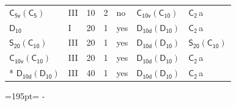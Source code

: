 \documentclass[10pt,a4paper]{article}
\newcommand{\needspace}[1]{\par\penalty-100\begingroup\dimen0=#1\relax\dimen2=\pagegoal
  \advance\dimen2-\pagetotal\ifdim\dimen0>\dimen2\relax\ifdim\dimen2>0pt\vfil\break\fi\fi
  \endgroup}
\numberwithin{equation}{section}
\newcommand{\grp}[1]{\mathsf{#1}}
\newcommand{\clsletter}[1]{\,{\scriptsize\color{black!55}#1}}
\begin{document}
{\begin{longtable}{@{}llrrlll@{}}
\href{C5v-C5.pdf}{$\grp{C_{5v}}(\grp{C_{5}})$} & III & 10 & 2 & no & \href{C10v-C10.pdf}{$\grp{C_{10v}}(\grp{C_{10}})$} & \href{../../../rotation/data/pdf/C2.pdf}{$\grp{C_{2}}$}\clsletter{a}\\
\href{../../../rotation/data/pdf/D10.pdf}{$\grp{D_{10}}$} & I & 20 & 1 & yes & \href{D10d-D10.pdf}{$\grp{D_{10d}}(\grp{D_{10}})$} & \href{../../../rotation/data/pdf/C2.pdf}{$\grp{C_{2}}$}\clsletter{a}\\
\href{S20-C10.pdf}{$\grp{S_{20}}(\grp{C_{10}})$} & III & 20 & 1 & yes & \href{D10d-D10.pdf}{$\grp{D_{10d}}(\grp{D_{10}})$} & \href{S20-C10.pdf}{$\grp{S_{20}}(\grp{C_{10}})$}\\
\href{C10v-C10.pdf}{$\grp{C_{10v}}(\grp{C_{10}})$} & III & 20 & 1 & yes & \href{D10d-D10.pdf}{$\grp{D_{10d}}(\grp{D_{10}})$} & \href{../../../rotation/data/pdf/C2.pdf}{$\grp{C_{2}}$}\clsletter{a}\\*
\href{D10d-D10.pdf}{$\grp{D_{10d}}(\grp{D_{10}})$} & III & 40 & 1 & yes & \href{D10d-D10.pdf}{$\grp{D_{10d}}(\grp{D_{10}})$} & \href{../../../rotation/data/pdf/C2.pdf}{$\grp{C_{2}}$}\clsletter{a}\\
\bottomrule\end{longtable}}
\needspace{195pt}
\end{document}
